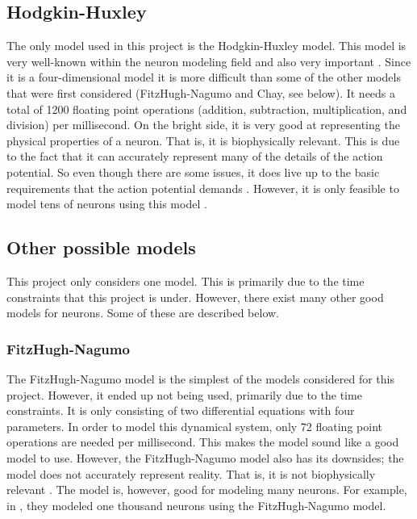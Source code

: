 \documentclass[class={myRUCProject}, crop=false]{standalone}
\begin{document}
\subsection{Hodgkin-Huxley}
The only model used in this project is the Hodgkin-Huxley model. This model is very well-known within the neuron modeling field and also very important \cite{Izhikevich2004}. Since it is a four-dimensional model  it is more difficult than some of the other models that were first considered (FitzHugh-Nagumo and Chay, see below). It needs a total of 1200 floating point operations (addition, subtraction, multiplication, and division) per millisecond. On the bright side, it is very good at representing the physical properties of a neuron. That is, it is biophysically relevant. This is due to the fact that it can accurately represent many of the details of the action potential. So even though there are some issues, it does live up to the basic requirements that the action potential demands \cite{White2002}. However, it is only feasible to model tens of neurons using this model \cite{Izhikevich2004}. 

\subsection{Other possible models}
This project only considers one model. This is primarily due to the time constraints that this project is under. However, there exist many other good models for neurons. Some of these are described below.

\subsubsection*{FitzHugh-Nagumo}
The FitzHugh-Nagumo model is the simplest of the models considered for this project. However, it ended up not being used, primarily due to the time constraints. It is only consisting of two differential equations with four parameters. In order to model this dynamical system, only 72 floating point operations are needed per millisecond. This makes the model sound like a good model to use. However, the FitzHugh-Nagumo model also has its downsides; the model does not accurately represent reality. That is, it is not biophysically relevant \cite{Izhikevich2004}. The model is, however, good for modeling many neurons. For example, in \cite{Ibrahim2021}, they modeled one thousand neurons using the FitzHugh-Nagumo model.
\end{document}
